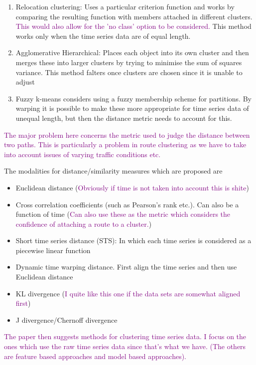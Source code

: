 \documentclass{article}
\newcommand\NOTE[1]{\textcolor{purple}{#1}}
\begin{document}
    \begin{enumerate}
        \item Relocation clustering: Uses a particular criterion function and works by comparing the resulting function with members attached in different clusters. \NOTE{This would also allow for the 'no class' option to be considered.} This method works only when the time series data are of equal length.
        \item Agglomerative Hierarchical: Places each object into its own cluster and then merges these into larger clusters by trying to minimise the sum of squares variance. This method falters once clusters are chosen since it is unable to adjust
        \item Fuzzy k-means considers using a fuzzy membership scheme for partitions. By warping it is possible to make these more appropriate for time series data of unequal length, but then the distance metric needs to account for this.
    \end{enumerate}

    \NOTE{The major problem here concerns the metric used to judge the distance between two paths. This is particularly a problem in route clustering as we have to take into account issues of varying traffic conditions etc.}

    The modalities for distance/similarity measures which are proposed are

    \begin{itemize}
        \item Euclidean distance (\NOTE{Obviously if time is not taken into account this is shite})
        \item Cross correlation coefficients (such as Pearson's rank etc.). Can also be a function of time (\NOTE{Can also use these as the metric which considers the confidence of attaching a route to a cluster.})
        \item Short time series distance (STS): In which each time series is considered as a piecewise linear function
        \item Dynamic time warping distance. First align the time series and then use Euclidean distance
        \item KL divergence (\NOTE{I quite like this one if the data sets are somewhat aligned first})
        \item J divergence/Chernoff divergence
    \end{itemize}

    \NOTE{The paper then suggests methods for clustering time series data. I focus on the ones which use the raw time series data since that's what we have. (The others are feature based approaches and model based approaches).}
\end{document}
